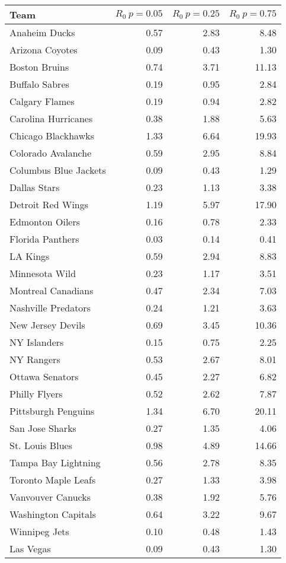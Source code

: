\documentclass[letterpaper,10pt]{article}
\begin{document}
\begin{table}[ht]
\centering
\begin{tabular}{lrrr}
  \hline
Team & $R_0\ p=0.05$ & $R_0\ p=0.25$ & $R_0\ p=0.75$ \\ 
  \hline
Anaheim Ducks & 0.57 & 2.83 & 8.48 \\ 
Arizona Coyotes & 0.09 & 0.43 & 1.30 \\ 
Boston Bruins & 0.74 & 3.71 & 11.13 \\ 
Buffalo Sabres & 0.19 & 0.95 & 2.84 \\ 
Calgary Flames & 0.19 & 0.94 & 2.82 \\ 
Carolina Hurricanes & 0.38 & 1.88 & 5.63 \\ 
Chicago Blackhawks & 1.33 & 6.64 & 19.93 \\ 
Colorado Avalanche & 0.59 & 2.95 & 8.84 \\ 
Columbus Blue Jackets & 0.09 & 0.43 & 1.29 \\ 
Dallas Stars & 0.23 & 1.13 & 3.38 \\ 
Detroit Red Wings & 1.19 & 5.97 & 17.90 \\ 
Edmonton Oilers & 0.16 & 0.78 & 2.33 \\ 
Florida Panthers & 0.03 & 0.14 & 0.41 \\ 
LA Kings & 0.59 & 2.94 & 8.83 \\ 
Minnesota Wild & 0.23 & 1.17 & 3.51 \\ 
Montreal Canadians & 0.47 & 2.34 & 7.03 \\ 
Nashville Predators & 0.24 & 1.21 & 3.63 \\ 
New Jersey Devils & 0.69 & 3.45 & 10.36 \\ 
NY Islanders & 0.15 & 0.75 & 2.25 \\ 
NY Rangers & 0.53 & 2.67 & 8.01 \\ 
Ottawa Senators & 0.45 & 2.27 & 6.82 \\ 
Philly Flyers & 0.52 & 2.62 & 7.87 \\ 
Pittsburgh Penguins & 1.34 & 6.70 & 20.11 \\ 
San Jose Sharks & 0.27 & 1.35 & 4.06 \\ 
St. Louis Blues & 0.98 & 4.89 & 14.66 \\ 
Tampa Bay Lightning & 0.56 & 2.78 & 8.35 \\ 
Toronto Maple Leafs & 0.27 & 1.33 & 3.98 \\ 
Vanvouver Canucks & 0.38 & 1.92 & 5.76 \\ 
Washington Capitals & 0.64 & 3.22 & 9.67 \\ 
Winnipeg Jets & 0.10 & 0.48 & 1.43 \\ 
Las Vegas & 0.09 & 0.43 & 1.30 \\ 
\hline
\end{tabular}
\end{table}
\end{document}
